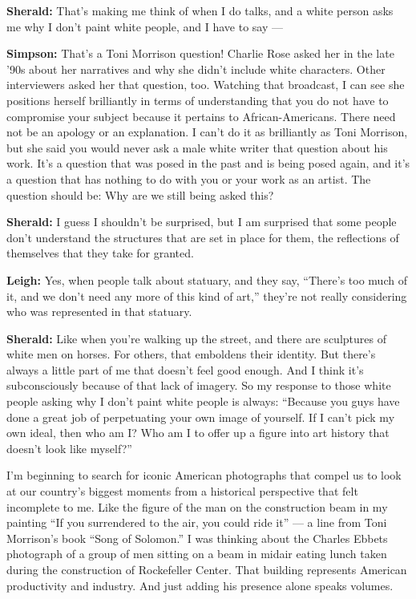 \textbf{Sherald:} That's making me think of when I do talks, and a white
person asks me why I don't paint white people, and I have to say ---

\textbf{Simpson:} That's a Toni Morrison question! Charlie Rose asked
her in the late '90s about her narratives and why she didn't include
white characters. Other interviewers asked her that question, too.
Watching that broadcast, I can see she positions herself brilliantly in
terms of understanding that you do not have to compromise your subject
because it pertains to African-Americans. There need not be an apology
or an explanation. I can't do it as brilliantly as Toni Morrison, but
she said you would never ask a male white writer that question about his
work. It's a question that was posed in the past and is being posed
again, and it's a question that has nothing to do with you or your work
as an artist. The question should be: Why are we still being asked this?

\textbf{Sherald:} I guess I shouldn't be surprised, but I am surprised
that some people don't understand the structures that are set in place
for them, the reflections of themselves that they take for granted.

\textbf{Leigh:} Yes, when people talk about statuary, and they say,
``There's too much of it, and we don't need any more of this kind of
art,'' they're not really considering who was represented in that
statuary.

\textbf{Sherald:} Like when you're walking up the street, and there are
sculptures of white men on horses. For others, that emboldens their
identity. But there's always a little part of me that doesn't feel good
enough. And I think it's subconsciously because of that lack of imagery.
So my response to those white people asking why I don't paint white
people is always: ``Because you guys have done a great job of
perpetuating your own image of yourself. If I can't pick my own ideal,
then who am I? Who am I to offer up a figure into art history that
doesn't look like myself?''

I'm beginning to search for iconic American photographs that compel us
to look at our country's biggest moments from a historical perspective
that felt incomplete to me. Like the figure of the man on the
construction beam in my painting ``If you surrendered to the air, you
could ride it'' --- a line from Toni Morrison's book ``Song of
Solomon.'' I was thinking about the Charles Ebbets photograph of a group
of men sitting on a beam in midair eating lunch taken during the
construction of Rockefeller Center. That building represents American
productivity and industry. And just adding his presence alone speaks
volumes.

